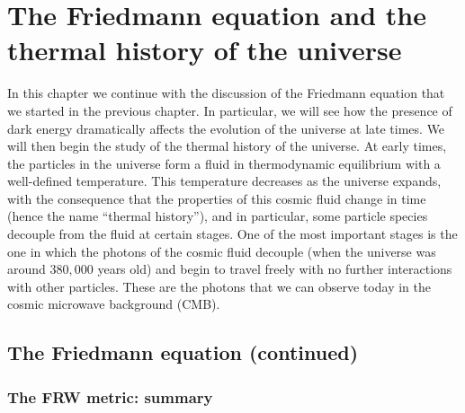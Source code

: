 \documentclass[11pt, a4paper,oneside,openright]{book}
\numberwithin{equation}{section}
\begin{document}
\chapter{The Friedmann equation and the thermal history of the universe}

In this chapter we continue with the discussion of the Friedmann equation that we started in the previous chapter. In particular, we will see how the presence of dark energy dramatically affects the evolution of the universe at late times. We will then begin the study of the thermal history of the universe. At early times, the particles in the universe form a fluid in thermodynamic equilibrium with a well-defined temperature. This temperature decreases as the universe expands, with the consequence that the properties of this cosmic fluid change in time (hence the name ``thermal history''), and in particular, some particle species decouple from the fluid at certain stages. One of the most important stages is the one in which the photons of the cosmic fluid decouple (when the universe was around $380,000$ years old) and begin to travel freely with no further interactions with other particles. These are the photons that we can observe today in the cosmic microwave background (CMB).

\section{The Friedmann equation (continued)}

\subsection{The FRW metric: summary}
\end{document}
